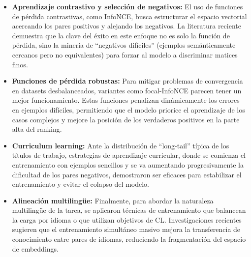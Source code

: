 \begin{itemize}
    \item \textbf{Aprendizaje contrastivo y selección de negativos:} El uso de funciones de pérdida contrastivas, como \gls{InfoNCE}, busca estructurar el espacio vectorial acercando los pares positivos y alejando los negativos. La literatura reciente \cite{solatorio2024gistembed} demuestra que la clave del éxito en este enfoque no es solo la función de pérdida, sino la minería de ``negativos difíciles'' (ejemplos semánticamente cercanos pero no equivalentes) para forzar al modelo a discriminar matices finos.
          
    \item \textbf{Funciones de pérdida robustas:} Para mitigar problemas de convergencia en datasets desbalanceados, variantes como focal-\gls{InfoNCE} \cite{hou2023improving} parecen tener un mejor funcionamiento. Estas funciones penalizan dinámicamente los errores en ejemplos difíciles, permitiendo que el modelo priorice el aprendizaje de los casos complejos y mejore la posición de los verdaderos positivos en la parte alta del ranking.
          
    \item \textbf{Curriculum learning:} Ante la distribución de ``long-tail'' típica de los títulos de trabajo, estrategias de aprendizaje curricular, donde se comienza el entrenamiento con ejemplos sencillos y se va aumentando progresivamente la dificultad de los pares negativos, demostraron ser eficaces para estabilizar el entrenamiento y evitar el colapso del modelo.
          
    \item \textbf{Alineación multilingüe:} Finalmente, para abordar la naturaleza multilingüe de la tarea, se aplicaron técnicas de entrenamiento que balancean la carga por idioma o que utilizan objetivos de \gls{CL}. Investigaciones recientes \cite{mao2024ems} sugieren que el entrenamiento simultáneo masivo mejora la transferencia de conocimiento entre pares de idiomas, reduciendo la fragmentación del espacio de embeddings.
\end{itemize}